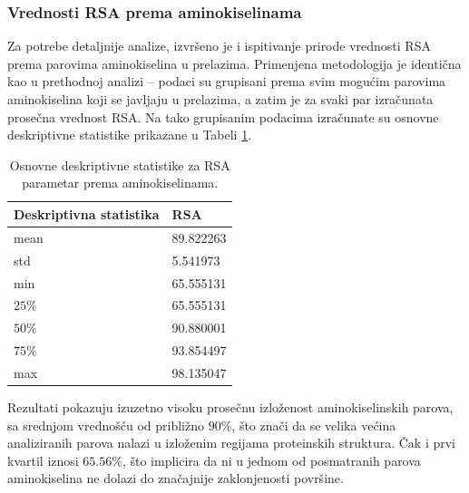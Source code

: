\documentclass[a4paper,12pt]{article}
\begin{document}
\subsubsection{Vrednosti RSA prema aminokiselinama}
Za potrebe detaljnije analize, izvršeno je i ispitivanje prirode vrednosti RSA prema parovima aminokiselina u prelazima. Primenjena metodologija je identična kao u prethodnoj analizi – podaci su grupisani prema svim mogućim parovima aminokiselina koji se javljaju u prelazima, a zatim je za svaki par izračunata prosečna vrednost RSA. Na tako grupisanim podacima izračunate su osnovne deskriptivne statistike prikazane u Tabeli \ref{Tabela:11}.
\begin{table}[h!]
    \centering
    \begin{tabular}{ |l|l| } 
    \hline
    \textbf{Deskriptivna statistika} & \textbf{RSA} \\
    \hline
    mean & 89.822263 \\
    std  & 5.541973 \\
    min  & 65.555131 \\
    $25\%$  & 65.555131 \\
    $50\%$  & 90.880001 	\\
    $75\%$ & 93.854497\\
    max & 98.135047 	\\
    \hline
    \end{tabular}
    \caption{Osnovne deskriptivne statistike za RSA parametar prema aminokiselinama.}
    \label{Tabela:11}
\end{table}

Rezultati pokazuju izuzetno visoku prosečnu izloženost aminokiselinskih parova, sa srednjom vrednošću od približno $90\%$, što znači da se velika većina analiziranih parova nalazi u izloženim regijama proteinskih struktura. Čak i prvi kvartil iznosi $65.56\%$, što implicira da ni u jednom od posmatranih parova aminokiselina ne dolazi do značajnije zaklonjenosti površine.
\end{document}
